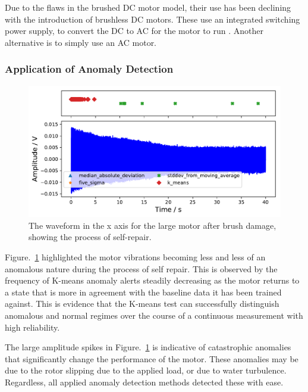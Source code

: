 Due to the flaws in the brushed DC motor model, their use has been declining with the introduction of brushless DC motors. These use an integrated switching power supply, to convert the DC to AC for the motor to run \cite{hanselman2003brushless}. Another alternative is to simply use an AC motor. 

\subsubsection{Application of Anomaly Detection}

\begin{figure}[t]
    \includegraphics[width=1.0\textwidth]{fig/large_manual_repair_large_12V.pdf}
    \caption[Anomaly Test Brush Damage]{The waveform in the x axis for the large motor after brush damage, showing the process of self-repair.}
    \label{fig:largemotor_brushdamage}
\end{figure}

Figure.~\ref{fig:largemotor_brushdamage} highlighted the motor vibrations becoming less and less of an anomalous nature during the process of self repair. This is observed by the frequency of K-means anomaly alerts steadily decreasing as the motor returns to a state that is more in agreement with the baseline data it has been trained against. This is evidence that the K-means test can successfully distinguish anomalous and normal regimes over the course of a continuous measurement with high reliability.

The large amplitude spikes in Figure.~\ref{fig:largemotor_brushdamage} is indicative of catastrophic anomalies that significantly change the performance of the motor. These anomalies may be due to the rotor slipping due to the applied load, or due to water turbulence. Regardless, all applied anomaly detection methods detected these with ease.

